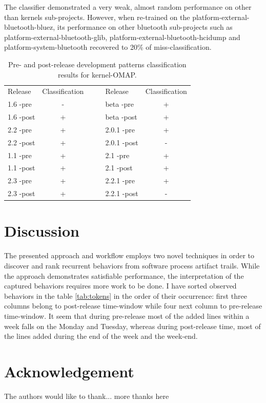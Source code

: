 \documentclass[10pt, conference, compsocconf]{IEEEtran}
\begin{document}
The classifier demonstrated a very weak, almost random performance on other than kernels sub-projects. 
However, when re-trained on the platform-external-bluetooth-bluez, its performance on other bluetooth
sub-projects such as platform-external-bluetooth-glib, platform-external-bluetooth-hcidump and
platform-system-bluetooth recovered to 20\% of miss-classification.

\begin{table}
  \caption{Pre- and post-release development patterns classification results for kernel-OMAP.}
  \label{tab:success}
  \begin{tabular}{ | l | c | c c | l | c |}
  \cline{1-2} \cline{5-6}
  Release & Classification& & & Release & Classification\\
  \cline{1-2} \cline{5-6}
1.6 -pre & - & & & beta -pre & + \\
1.6 -post & + & & & beta -post & + \\
2.2 -pre & + & & & 2.0.1 -pre & + \\
2.2 -post & + & & & 2.0.1 -post & -\\
1.1 -pre & + & & & 2.1 -pre & + \\
1.1 -post & + & & & 2.1 -post & + \\
2.3 -pre & + & & & 2.2.1 -pre & + \\
2.3 -post & + & & & 2.2.1 -post & - \\ 
  \cline{1-2} \cline{5-6}
  \end{tabular}
\end{table}

\section{Discussion}
The presented approach and workflow employs two novel techniques in order to discover and 
rank recurrent behaviors from software process artifact trails. While the approach 
demonstrates satisfiable performance, the interpretation of the captured behaviors requires
more work to be done. I have sorted observed behaviors in the table \ref{tab:tokens} in the 
order of their occurrence: first three columns belong to post-release time-window while
four next column to pre-release time-window. It seem that during pre-release most of the
added lines within a week falls on the Monday and Tuesday, whereas during post-release
time, most of the lines added during the end of the week and the week-end.

\section{Acknowledgement}
The authors would like to thank...
more thanks here
\end{document}
